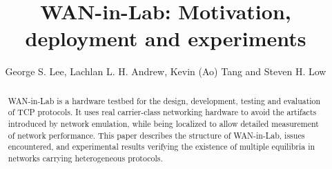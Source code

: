\documentclass{IEEEtran}
\begin{document}
\title{WAN-in-Lab: Motivation, deployment and experiments}
\author{George S. Lee, Lachlan L. H. Andrew, Kevin (Ao) Tang and Steven H. Low}
\maketitle

\begin{abstract}
WAN-in-Lab is a hardware testbed for the design, development, testing
and evaluation of TCP protocols.  It uses real carrier-class networking
hardware to avoid the artifacts introduced by network emulation, while
being localized to allow detailed measurement of network performance.
This paper describes the structure of WAN-in-Lab, issues encountered,
and experimental results verifying the existence of multiple equilibria
in networks carrying heterogeneous protocols.
\end{abstract}
\end{document}
